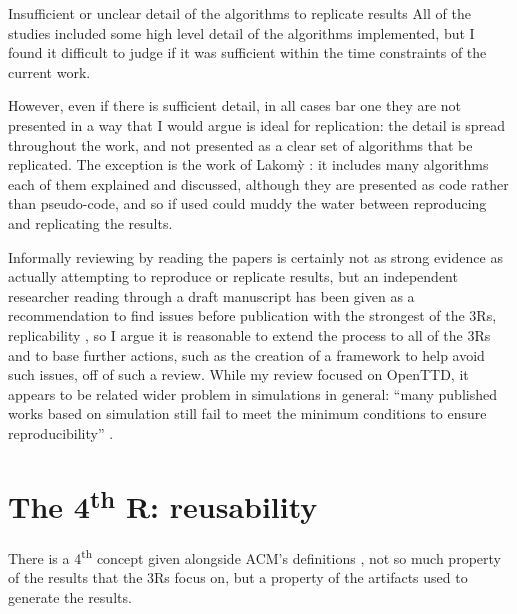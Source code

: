 \documentclass[logo,msc,dsti]{infthesis}    %
\begin{document}
{\begin{enumerate}
\begin{descitem}{Insufficient or unclear detail of the algorithms to replicate results}
All of the studies included some high level detail of the algorithms implemented, but I found it difficult to judge if it was sufficient within the time constraints of the current work.

However, even if there is sufficient detail, in all cases bar one they are not presented in a way that I would argue is ideal for replication: the detail is spread throughout the work, and not presented as a clear set of algorithms that be replicated. The exception is the work of {Lakom{\`y}} \cite{lakomy2020railroad}: it includes many algorithms each of them explained and discussed, although they are presented as code rather than pseudo-code, and so if used could muddy the water between reproducing and replicating the results.
\end{descitem}

\end{enumerate}

Informally reviewing by reading the papers is certainly not as strong evidence as actually attempting to reproduce or replicate results, but an independent researcher reading through a draft manuscript has been given as a recommendation to find issues before publication with the strongest of the 3Rs, replicability \cite{luijken2024replicability}, so I argue it is reasonable to extend the process to all of the 3Rs and to base further actions, such as the creation of a framework to help avoid such issues, off of such a review. While my review focused on OpenTTD, it appears to be related wider problem in simulations in general: ``many published works based on simulation still fail to meet the minimum conditions to ensure reproducibility'' \cite{dalle2012reproducibility}.

\section{The 4\textsuperscript{th} R: reusability}

There is a 4\textsuperscript{th} concept given alongside ACM's definitions \cite{association_for_computing_machiner_new_2020}, not so much property of the results that the 3Rs focus on, but a property of the artifacts used to generate the results.

}
\end{document}
